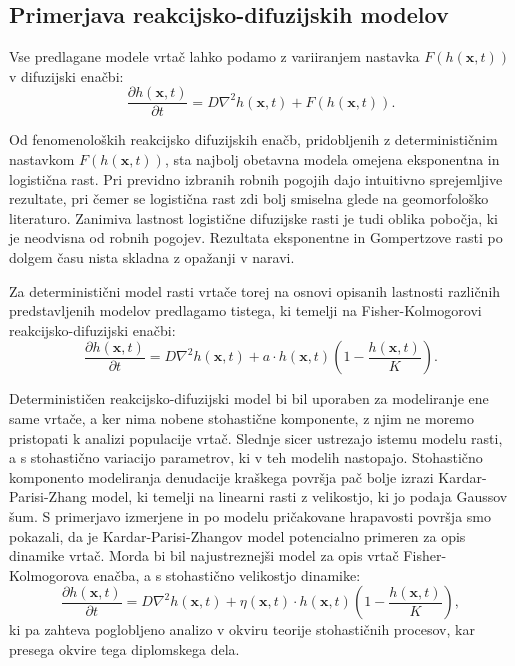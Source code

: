 \documentclass[a4paper, twoside, 12pt]{book}
\begin{document}
\subsection{Primerjava reakcijsko-difuzijskih modelov}

Vse predlagane modele vrtač lahko podamo z variiranjem nastavka $F(h(\mathbf{x},t))$ v difuzijski enačbi:
\begin{equation}
  \frac{ \partial h(\mathbf{x},t) }{ \partial t} = D \nabla^2 h(\mathbf{x},t) + F(h(\mathbf{x},t)).
  \label{dinamicna-splosna3}
\end{equation}

Od fenomenoloških reakcijsko difuzijskih enačb, pridobljenih z determinističnim nastavkom $F(h(\mathbf{x},t))$, sta najbolj obetavna modela omejena eksponentna in logistična rast. Pri previdno izbranih robnih pogojih dajo intuitivno sprejemljive rezultate, pri čemer se logistična rast zdi bolj smiselna glede na geomorfološko literaturo. Zanimiva lastnost logistične difuzijske rasti je tudi oblika pobočja, ki je neodvisna od robnih pogojev.
Rezultata eksponentne in Gompertzove rasti po dolgem času nista skladna z opažanji v naravi.

Za deterministični model rasti vrtače torej na osnovi opisanih lastnosti različnih predstavljenih modelov predlagamo tistega, ki temelji na Fisher-Kolmogorovi reakcijsko-difuzijski enačbi:
\begin{equation}
  \frac{ \partial h(\mathbf{x},t)}{ \partial t} = D \nabla^2 h(\mathbf{x},t) + a \cdot h(\mathbf{x},t) (1 - \frac{h(\mathbf{x},t)}{K}).
  \label{dinamicna-splosna4}
\end{equation}

Determinističen reakcijsko-difuzijski model bi bil uporaben za modeliranje ene same vrtače, a ker nima nobene stohastične komponente, z njim ne moremo pristopati k analizi populacije vrtač. Slednje sicer ustrezajo istemu modelu rasti, a s stohastično variacijo parametrov, ki v teh modelih nastopajo. Stohastično komponento modeliranja denudacije kraškega površja pač bolje izrazi Kardar-Parisi-Zhang model, ki temelji na linearni rasti z velikostjo, ki jo podaja Gaussov šum. S primerjavo izmerjene in po modelu pričakovane hrapavosti površja smo pokazali, da je Kardar-Parisi-Zhangov model potencialno primeren za opis dinamike vrtač. Morda bi bil najustreznejši model za opis vrtač Fisher-Kolmogorova enačba, a s stohastično velikostjo dinamike:
\begin{equation}
  \frac{ \partial h(\mathbf{x},t)}{ \partial t} = D \nabla^2 h(\mathbf{x},t) + \eta(\mathbf{x},t) \cdot h(\mathbf{x},t)(1 - \frac{h(\mathbf{x},t)}{K}),
  \label{dinamicna-splosna5}
\end{equation}
ki pa zahteva poglobljeno analizo v okviru teorije stohastičnih procesov, kar presega okvire tega diplomskega dela.
\end{document}
